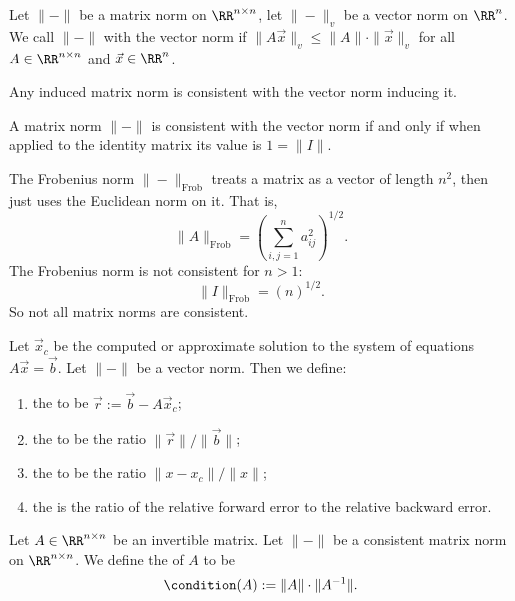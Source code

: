 \begin{definition}
Let $\|-\|$ be a matrix norm on $\RR^{n\times n}$, let $\|-\|_{v}$ be a
vector norm on $\RR^{n}$. We call $\|-\|$
 with the vector norm if
$\|A\vec{x}\|_{v}\leq\|A\|\cdot\|\vec{x}\|_{v}$ for all
$A\in\RR^{n\times n}$ and $\vec{x}\in\RR^{n}$.
\end{definition}

\begin{example}
Any induced matrix norm is consistent with the vector norm inducing it.
\end{example}

\begin{theorem}
A matrix norm $\|-\|$ is consistent with the vector norm if and only if
when applied to the identity matrix its value is $1=\|I\|$.
\end{theorem}

\begin{example}
The Frobenius norm $\|-\|_{\text{Frob}}$ treats a matrix as a vector of
length $n^{2}$, then just uses the Euclidean norm on it. That is,
\begin{equation}
\|A\|_{\text{Frob}}=\left(\sum^{n}_{i,j=1}a_{ij}^{2}\right)^{1/2}.
\end{equation}
The Frobenius norm is not consistent for $n>1$:
\begin{equation}
\|I\|_{\text{Frob}}=\left(n\right)^{1/2}.
\end{equation}
So not all matrix norms are consistent.
\end{example}

\begin{definition}
Let $\vec{x}_{c}$ be the computed or approximate solution to the system
of equations $A\vec{x}=\vec{b}$. Let $\|-\|$ be a vector norm. Then we define:
\begin{enumerate}
\item the  to be $\vec{r}:=\vec{b}-A\vec{x}_{c}$;
\item the  to be the ratio $\|\vec{r}\|/\|\vec{b}\|$;
\item the  to be the ratio $\|x-x_{c}\|/\|x\|$;
\item the  is the ratio of the relative
  forward error to the relative backward error.
\end{enumerate}
\end{definition}

\begin{definition}
Let $A\in\RR^{n\times n}$ be an invertible matrix. Let $\|-\|$ be a
consistent matrix norm on $\RR^{n\times n}$. We define the
 of $A$ to be
\begin{equation}
\condition(A) := \|A\|\cdot\|A^{-1}\|.
\end{equation}
\end{definition}

